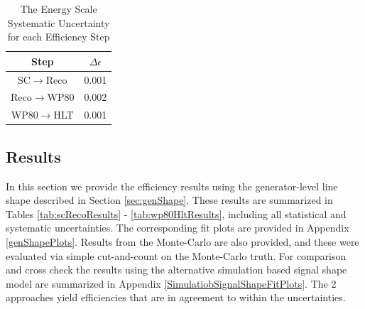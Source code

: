 \begin{table}
  \begin{center}
    \caption{The Energy Scale Systematic Uncertainty for each Efficiency Step}
    \label{tab:scaleSyst}
    \vskip 2mm
    \begin{tabular}{c|c}\hline \hline
      Step            & $\Delta\epsilon$ \\ \hline
      SC$\to$Reco     & 0.001 \\
      Reco$\to$WP80     & 0.002 \\
      WP80$\to$HLT     & 0.001 \\ \hline
    \end{tabular}
  \end{center}
\end{table}



\clearpage

\subsection{Results}
In this section we provide the efficiency results using the generator-level line shape described in Section \ref{sec:genShape}.
These results are summarized in Tables \ref{tab:scRecoResults} - \ref{tab:wp80HltResults}, including all statistical and systematic uncertainties.  The corresponding fit plots are provided in Appendix \ref{genShapePlots}. Results from the Monte-Carlo are also provided, and these were evaluated via simple cut-and-count on the Monte-Carlo truth. For comparison and cross check the results using the alternative simulation based signal shape model are summarized in Appendix \ref{SimulatiobSignalShapeFitPlots}. The 2 approaches yield efficiencies that are in agreement to within the uncertainties. 







